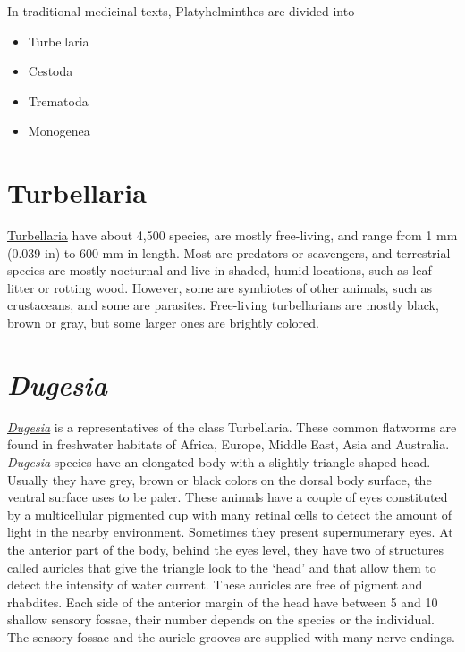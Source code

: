 In traditional medicinal texts, Platyhelminthes are divided into

\begin{itemize}
\tightlist
\item
  Turbellaria
\item
  Cestoda
\item
  Trematoda
\item
  Monogenea
\end{itemize}

\section{Turbellaria}\label{turbellaria}

\href{https://en.wikipedia.org/wiki/Turbellaria}{Turbellaria} have about
4,500 species, are mostly free-living, and range from 1 mm (0.039 in) to
600 mm in length. Most are predators or scavengers, and terrestrial
species are mostly nocturnal and live in shaded, humid locations, such
as leaf litter or rotting wood. However, some are symbiotes of other
animals, such as crustaceans, and some are parasites. Free-living
turbellarians are mostly black, brown or gray, but some larger ones are
brightly colored.

\section{\texorpdfstring{\emph{Dugesia}}{Dugesia}}\label{dugesia}

\href{https://en.wikipedia.org/wiki/Dugesia}{\emph{Dugesia}} is a
representatives of the class Turbellaria. These common flatworms are
found in freshwater habitats of Africa, Europe, Middle East, Asia and
Australia. \emph{Dugesia} species have an elongated body with a slightly
triangle-shaped head. Usually they have grey, brown or black colors on
the dorsal body surface, the ventral surface uses to be paler. These
animals have a couple of eyes constituted by a multicellular pigmented
cup with many retinal cells to detect the amount of light in the nearby
environment. Sometimes they present supernumerary eyes. At the anterior
part of the body, behind the eyes level, they have two of structures
called auricles that give the triangle look to the `head' and that allow
them to detect the intensity of water current. These auricles are free
of pigment and rhabdites. Each side of the anterior margin of the head
have between 5 and 10 shallow sensory fossae, their number depends on
the species or the individual. The sensory fossae and the auricle
grooves are supplied with many nerve endings.

